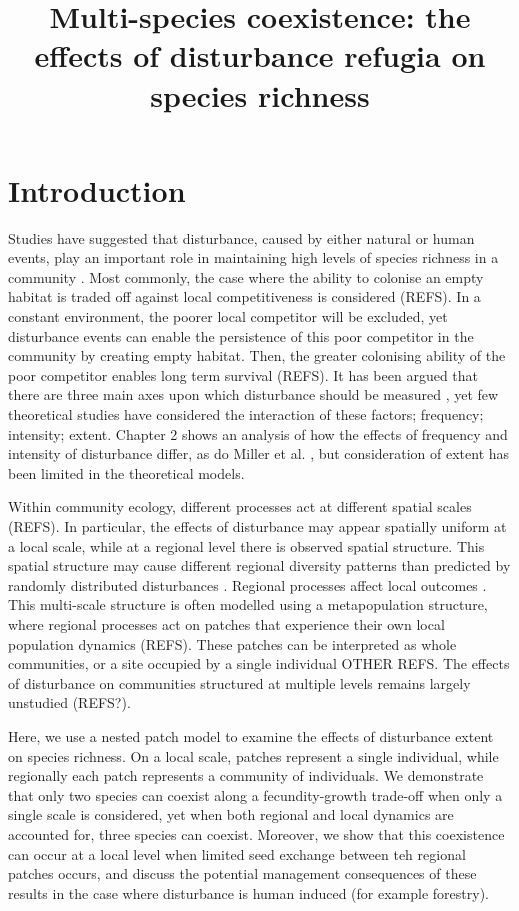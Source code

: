\documentclass[preprint,10pt,reqno]{amsart}
\begin{document}
\title{Multi-species coexistence: the effects of disturbance refugia on species richness}
\section{Introduction}
Studies have suggested that disturbance, caused by either natural or human events, play an important role in maintaining high levels of species richness in a community \cite{connell1978diversity,huston1979general,sousa1984role,schoener1974resource}. Most commonly, the case where the ability to colonise an empty habitat is traded off against local competitiveness is considered (REFS). In a constant environment, the poorer local competitor will be excluded, yet disturbance events can enable the persistence of this poor competitor in the community by creating empty habitat. Then, the greater colonising ability of the poor competitor enables long term survival (REFS). It has been argued that there are three main axes upon which disturbance should be measured \cite{malanson1984intensity,miller1982community,sousa1984role}, yet few theoretical studies have considered the interaction of these factors; frequency; intensity; extent. Chapter 2 shows an analysis of how the effects of frequency and intensity of disturbance differ, as do Miller et al. \cite{miller2011frequency}, but consideration of extent has been limited in the theoretical models.

Within community ecology, different processes act at different spatial scales (REFS). In particular, the effects of disturbance may appear spatially uniform at a local scale, while at a regional level there is observed spatial structure. This spatial structure may cause different regional diversity patterns than predicted by randomly distributed disturbances \cite{vuilleumier2007patch}. Regional processes affect local outcomes \cite{holt1993ecology}. This multi-scale structure is often modelled using a metapopulation structure, where regional processes act on patches that experience their own local population dynamics (REFS). These patches can be interpreted as whole communities, or a site occupied by a single individual \cite{tilman1994competition,calcagno2006coexistence} OTHER REFS.  The effects of disturbance on communities structured at multiple levels remains largely unstudied (REFS?).

Here, we use a nested patch model to examine the effects of disturbance extent on species richness. On a local scale, patches represent a single individual, while regionally each patch represents a community of individuals. We demonstrate that only two species can coexist along a fecundity-growth trade-off when only a single scale is considered, yet when both regional and local dynamics are accounted for, three species can coexist. Moreover, we show that this coexistence can occur at a local level when limited seed exchange between teh regional patches occurs, and discuss the potential management consequences of these results in the case where disturbance is human induced (for example forestry).
\end{document}
